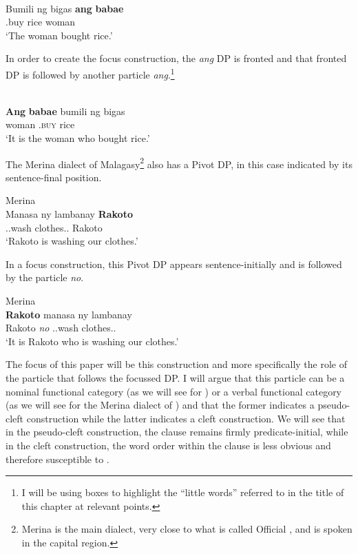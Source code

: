 \documentclass[output=paper]{langsci/langscibook}
\begin{document}
\ea\label{ex:Tbasic}\\
    \gll Bumili ng bigas \textbf{ang} \textbf{babae}\\
    \At{}.buy \Acc{} rice \Nom{} woman\\
    \glt `The woman bought rice.'
\z

In order to create the focus construction, the \emph{ang} DP is
fronted and that fronted DP is followed by another particle
\emph{ang}.\footnote{I will be using boxes to highlight the \enquote{little
words} referred to in the title of this chapter at relevant points.}

\ea {}\\
    \gll  \textbf{Ang} \textbf{babae}  bumili ng bigas\\
    \Nom{} woman \Nom{} \At.\textsc{buy} \Acc{} rice\\
    \glt `It is the woman who bought rice.'
\z

The Merina dialect of Malagasy\footnote{Merina is the main dialect, very close
to what is called Official , and is spoken in the capital region.} also
has a Pivot DP, in this case indicated by its sentence-final position.

\ea Merina\\
	\gll Manasa ny lambanay \textbf{Rakoto}\\
    \Prs.\At{}.wash \Det{} clothes.\Fpl.\Excl{} Rakoto\\
    \glt `Rakoto is washing our clothes.'
\z

In a focus construction, this Pivot DP appears sentence-initially and is
followed by the particle \emph{no}.

\ea Merina\\
	\gll  \textbf{Rakoto}  manasa ny lambanay\\
    Rakoto \emph{no} \Prs.\At{}.wash \Det{} clothes.\Fpl.\Excl{}\\
    \glt `It is Rakoto who is washing our clothes.'
\z

The focus of this paper will be this construction and more specifically the
role of the particle that follows the focussed DP.  I will argue that this
particle can be a nominal functional category (as we will see for ) or a
verbal functional category (as we will see for the Merina dialect of )
and that the former indicates a pseudo-cleft construction while the latter
indicates a cleft construction.  We will see that in the pseudo-cleft
construction, the clause remains firmly predicate-initial, while in the cleft
construction, the word order within the clause is less obvious and therefore
susceptible to .
\end{document}
